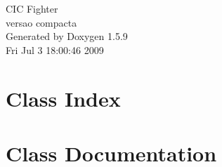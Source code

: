 \documentclass[a4paper]{book}
\begin{document}
\hypersetup{pageanchor=false}
\begin{titlepage}
\vspace*{7cm}
\begin{center}
{\Large CIC Fighter \\[1ex]\large versao compacta }\\
\vspace*{1cm}
{\large Generated by Doxygen 1.5.9}\\
\vspace*{0.5cm}
{\small Fri Jul 3 18:00:46 2009}\\
\end{center}
\end{titlepage}
\clearemptydoublepage
{}
\tableofcontents
\clearemptydoublepage
{}
\hypersetup{pageanchor=true}
\chapter{Class Index}

\chapter{Class Documentation}













\printindex
\end{document}
